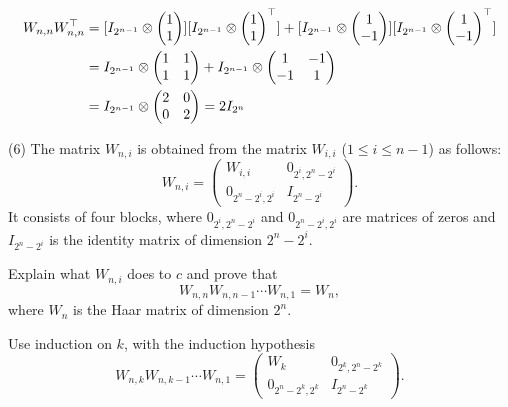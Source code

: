 \documentclass[12pt]{article}
\begin{document}
\begin{align*}
W_{n, n} \transpos{W_{n, n}} &= 
[I_{2^{n-1}} \tensor 
\begin{pmatrix}
1 \\
1
\end{pmatrix}]
[I_{2^{n-1}} \tensor 
\transpos{\begin{pmatrix}
1 \\
1
\end{pmatrix}
}] + 
[I_{2^{n-1}} \tensor 
\begin{pmatrix}
1 \\
-1
\end{pmatrix}]
[I_{2^{n-1}} \tensor 
\transpos{
\begin{pmatrix}
1 \\
-1
\end{pmatrix}}] \\
&=
I_{2^{n-1}} \tensor 
\begin{pmatrix}
1 &1 \\
1 &1 
\end{pmatrix} +
I_{2^{n-1}} \tensor 
\begin{pmatrix}
1 &-1 \\
-1 &1 
\end{pmatrix} \\
&= 
I_{2^{n-1}} \tensor 
\begin{pmatrix}
2 &0 \\
0 &2 
\end{pmatrix} = 
2I_{2^n} 
\end{align*}





\medskip
(6)
The matrix $W_{n, i}$ is obtained from the matrix $W_{i, i}$ 
($1 \leq i \leq n - 1$) as follows:
\[
W_{n, i} = 
\begin{pmatrix}
 W_{i, i} & 0_{2^{i}, 2^{n} - 2^{i}} \\
0_{2^{n}- 2^{i}, 2^i} & I_{2^{n} - 2^{i}}
\end{pmatrix}.
\]
It consists of four blocks,
where  $0_{2^{i}, 2^{n} - 2^{i}}$ and $0_{2^{n} - 2^{i}, 2^i}$
are matrices of zeros and $I_{2^{n} - 2^{i}}$ is the identity matrix of
dimension $2^{n} - 2^i$.

\medskip
Explain what $W_{n, i}$ does to $c$ and prove that
\[
W_{n, n} W_{n, n - 1} \cdots W_{n, 1} = W_n,
\]
where $W_n$ is the Haar matrix of dimension $2^n$.

\medskip
\hint
Use induction on $k$,  with the induction hypothesis
\[
W_{n, k} W_{n, k - 1}\cdots W_{n, 1} = 
\begin{pmatrix}
 W_{k} & 0_{2^{k}, 2^{n} - 2^{k}} \\
0_{2^{n}- 2^{k}, 2^k} &  I_{2^{n} - 2^{k}}
\end{pmatrix}.
\]
\end{document}
